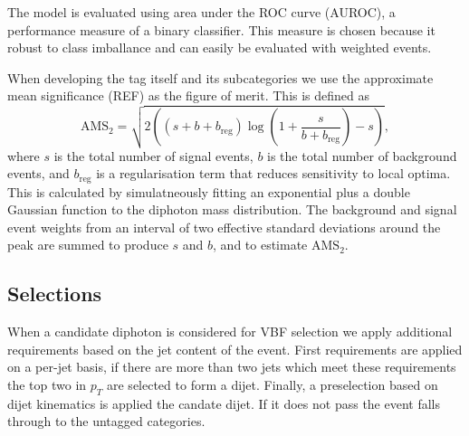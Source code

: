 The model is evaluated using area under the ROC curve (AUROC), a performance measure of a binary classifier. 
This measure is chosen because it robust to class imballance and can easily be evaluated with weighted events.

When developing the tag itself and its subcategories we use the approximate mean significance (REF) as the figure of merit. This is defined as
\begin{equation}
    \mathrm{AMS}_{2} = \sqrt{2\left( (s+b+b_{\mathrm{reg}})\log\left(1 + \frac{s}{b+b_{\mathrm{reg}}}\right) - s \right)},
\end{equation}
where $s$ is the total number of signal events, $b$ is the total number of background events, and $b_{\mathrm{reg}}$ is a regularisation term that reduces sensitivity to local optima. 
This is calculated by simulatneously fitting an exponential plus a double Gaussian function to the diphoton mass distribution. 
The background and signal event weights from an interval of two effective standard deviations around the peak are summed to produce $s$ and $b$, and to estimate $\mathrm{AMS}_{2}$. 







\subsection{Selections}
When a candidate diphoton is considered for VBF selection we apply additional requirements based on the jet content of the event. First requirements are applied on a per-jet basis, if there are more than two jets which meet these requirements the top two in $p_{T}$ are selected to form a dijet. Finally, a preselection based on dijet kinematics is applied the candate dijet. If it does not pass the event falls through to the untagged categories. 

